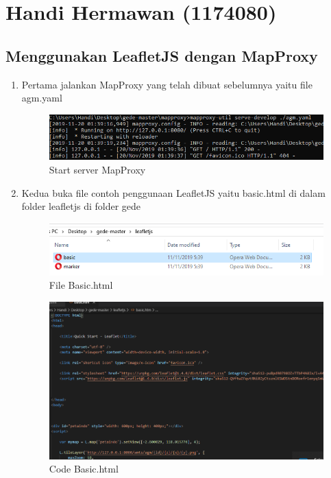 \section{Handi Hermawan (1174080)}
\subsection{Menggunakan LeafletJS dengan MapProxy}
\begin{enumerate}
    \item Pertama jalankan MapProxy yang telah dibuat sebelumnya yaitu file agm.yaml
    \hfill\break
    \begin{figure}[H]
		\includegraphics[width=12cm]{figures/Tugas5/1174080/1.png}
		\centering
		\caption{Start server MapProxy}
	\end{figure}
    \item Kedua buka file contoh penggunaan LeafletJS yaitu basic.html di dalam folder leafletjs di folder gede
    \hfill\break
    \begin{figure}[H]
		\includegraphics[width=12cm]{figures/Tugas5/1174080/2.png}
		\centering
		\caption{File Basic.html}
	\end{figure}
	\begin{figure}[H]
		\includegraphics[width=12cm]{figures/Tugas5/1174080/3.png}
		\centering
		\caption{Code Basic.html}
	\end{figure}

\end{enumerate}

